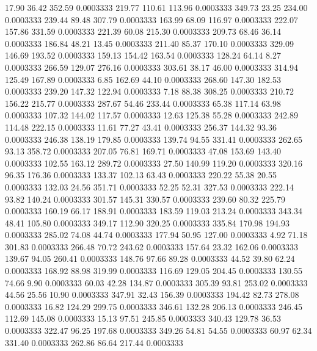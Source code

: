   17.90   36.42  352.59   0.0003333
 219.77  110.61  113.96   0.0003333
 349.73   23.25  234.00   0.0003333
 239.44   89.48  307.79   0.0003333
 163.99   68.09  116.97   0.0003333
 222.07  157.86  331.59   0.0003333
 221.39   60.08  215.30   0.0003333
 209.73   68.46   36.14   0.0003333
 186.84   48.21   13.45   0.0003333
 211.40   85.37  170.10   0.0003333
 329.09  146.69  193.52   0.0003333
 159.13  154.42  163.54   0.0003333
 128.24   64.14    8.27   0.0003333
 266.59  129.07  276.16   0.0003333
 303.61   38.17   46.00   0.0003333
 314.94  125.49  167.89   0.0003333
   6.85  162.69   44.10   0.0003333
 268.60  147.30  182.53   0.0003333
 239.20  147.32  122.94   0.0003333
   7.18   88.38  308.25   0.0003333
 210.72  156.22  215.77   0.0003333
 287.67   54.46  233.44   0.0003333
  65.38  117.14   63.98   0.0003333
 107.32  144.02  117.57   0.0003333
  12.63  125.38   55.28   0.0003333
 242.89  114.48  222.15   0.0003333
  11.61   77.27   43.41   0.0003333
 256.37  144.32   93.36   0.0003333
 246.38  138.19  179.85   0.0003333
 139.74   94.55  331.41   0.0003333
 262.65   93.13  358.72   0.0003333
 207.05   76.81  169.71   0.0003333
  47.08  153.69  143.40   0.0003333
 102.55  163.12  289.72   0.0003333
  27.50  140.99  119.20   0.0003333
 320.16   96.35  176.36   0.0003333
 133.37  102.13   63.43   0.0003333
 220.22   55.38   20.55   0.0003333
 132.03   24.56  351.71   0.0003333
  52.25   52.31  327.53   0.0003333
 222.14   93.82  140.24   0.0003333
 301.57  145.31  330.57   0.0003333
 239.60   80.32  225.79   0.0003333
 160.19   66.17  188.91   0.0003333
 183.59  119.03  213.24   0.0003333
 343.34   48.41  105.80   0.0003333
 349.17  112.90  320.25   0.0003333
 335.84  170.98  194.93   0.0003333
 285.02   74.08   44.74   0.0003333
 177.94   50.95  127.00   0.0003333
   4.92   71.18  301.83   0.0003333
 266.48   70.72  243.62   0.0003333
 157.64   23.32  162.06   0.0003333
 139.67   94.05  260.41   0.0003333
 148.76   97.66   89.28   0.0003333
  44.52   39.80   62.24   0.0003333
 168.92   88.98  319.99   0.0003333
 116.69  129.05  204.45   0.0003333
 130.55   74.66    9.90   0.0003333
  60.03   42.28  134.87   0.0003333
 305.39   93.81  253.02   0.0003333
  44.56   25.56   10.90   0.0003333
 347.91   32.43  156.39   0.0003333
 194.42   82.73  278.08   0.0003333
  16.82  124.29  299.75   0.0003333
 346.61  132.28  206.13   0.0003333
 246.45  112.69  145.08   0.0003333
  15.13   97.51  245.85   0.0003333
 340.43  129.78   36.53   0.0003333
 322.47   96.25  197.68   0.0003333
 349.26   54.81   54.55   0.0003333
  60.97   62.34  331.40   0.0003333
 262.86   86.64  217.44   0.0003333
